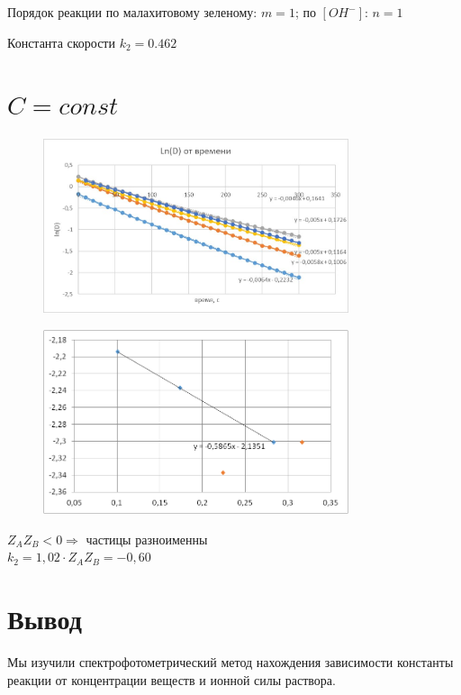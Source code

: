 \documentclass[a4paper, 12pt]{article}
\begin{document}
Порядок реакции по малахитовому зеленому: $m=1$;
по $[OH^-]$: $n=1$

Константа скорости $k_2=0.462$



\newpage
\section*{$C=const$}

\begin{figure}[h!]
	\centering
	\caption{}
	\includegraphics[width=0.8\textwidth]{1.jpg}
\end{figure}

\begin{figure}[h!]
	\centering
	\caption{}
	\includegraphics[width=0.8\textwidth]{image006.png}
\end{figure}

$Z_AZ_B<0 \Rightarrow $ частицы разноименны\\


$k_2=1,02\cdot Z_AZ_B=-0,60$

\newpage
\section{Вывод}
Мы изучили спектрофотометрический метод нахождения зависимости константы реакции от концентрации веществ и ионной силы раствора.
\end{document}
